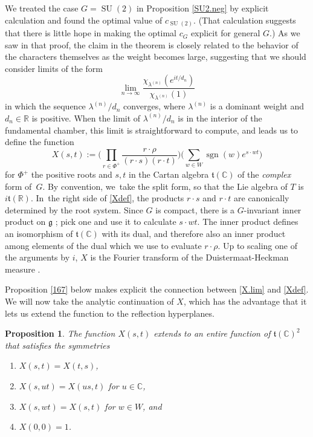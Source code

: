 \documentclass[JEP,XML,SOM,Unicode,NoFloatCountersInSection,published]{cedram}
\newenvironment{enumeratea}
{\bgroup\def\theenumi{\alph{enumi}}\def\theenumii{\roman{enumii}}\begin{enumerate}}
{\end{enumerate}\egroup}
\newtheorem{prop}[equation]{Proposition}
\theoremstyle{definition}
\newcommand{\mfg}{\mathfrak{g}}
\newcommand{\mft}{\mathfrak{t}}
\newcommand{\R}{\mathbb{R}}
\newcommand{\C}{\mathbb{C}}
\DeclareMathOperator{\SU}{SU}
\DeclareMathOperator{\sgn}{sgn}
\begin{document}
We treated the case $G = \SU(2)$ in Proposition \ref{SU2.neg} by explicit calculation and found the optimal value of $c_{\SU(2)}$. (That calculation suggests that there is little hope in making the optimal $c_G$ explicit for general $G$.)
As we saw in that proof, the claim in the theorem
is closely related to the behavior of the characters themselves as the
weight becomes large, suggesting that we should consider limits of the form
\begin{equation} \label{X.lim}
\lim_{n\to\infty}
\frac{\chi_{\lambda^{(n)}}(e^{it/d_n})}{\chi_{\lambda^{(n)}}(1)}
\end{equation}
in which the sequence $\lambda^{(n)}/d_n$ converges, where $\lambda^{(n)}$ is a dominant weight and $d_n \in \R$ is positive.
When the limit of
$\lambda^{(n)}/d_n$ is in the interior of the fundamental chamber, this
limit is straightforward to compute, and leads us to define the function
\begin{equation} \label{Xdef}
X(s,t):=
\biggl( \prod_{r\in \Phi^+} \frac{r\cdot \rho}{(r\cdot s)(r\cdot t)} \biggr)
\biggl( \sum_{w\in W} \sgn(w) e^{s\cdot wt} \biggr)
\end{equation}
for $\Phi^+$ the positive roots and $s,t$ in the Cartan algebra $\mft(\C)$ of the \emph{complex} form of~$G$. By convention, we~take the
split form, so that the Lie algebra of $T$ is $i{\mft}(\R)$. In~the right side of \eqref{Xdef}, the products $r \cdot s$ and $r \cdot t$ are canonically determined by the root system. Since $G$ is compact, there is a $G$-invariant inner product on $\mfg$ \cite[\S{IX.1.3}, Prop.\,1]{Bou:g7}; pick one and use it to calculate $s \cdot wt$. The inner product defines an isomorphism of $\mft(\C)$ with its dual, and therefore also an inner product among elements of the dual which we use to evaluate $r \cdot \rho$. Up to scaling one of the arguments by $i$, $X$ is the Fourier transform of the Duistermaat-Heckman measure \cite{EtingofRains}.

Proposition \ref{167} below makes explicit the connection between \eqref{X.lim} and \eqref{Xdef}.
We will now take the analytic continuation of $X$,
which has the
advantage that it lets us extend the
function to the reflection hyperplanes.

\begin{prop} \label{Xprop}
The function $X(s,t)$ extends to an entire function of $\mft(\C)^2$
that satisfies the symmetries
\begin{enumeratea}
\item $X(s,t)=X(t,s)$,
\item $X(s,ut)=X(us,t)$ for $u\in \C$,
\item $X(s,wt)=X(s,t)$ for $w\in W$, and
\item $X(0,0)=1$.
\end{enumeratea}
\end{prop}
\end{document}
